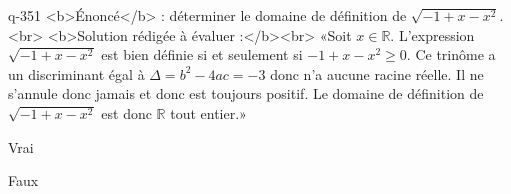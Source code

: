 \begin{truefalse}{q-351}
<b>Énoncé</b> : déterminer le domaine de définition de $\sqrt{-1+x-x^2}$.<br> <b>Solution rédigée à évaluer :</b><br>  «Soit $x\in\mathbb{R}$.  L'expression $\sqrt{-1+x-x^2}$ est bien définie si et seulement si $-1+x-x^2\geq 0$. Ce trinôme a un discriminant égal à $\Delta=b^2-4ac=-3$ donc n'a aucune racine réelle. Il ne s'annule donc jamais et donc est toujours positif. Le domaine de définition de $\sqrt{-1+x-x^2}$ est donc $\mathbb{R}$ tout entier.»
\item Vrai
\item* Faux
\end{truefalse}

